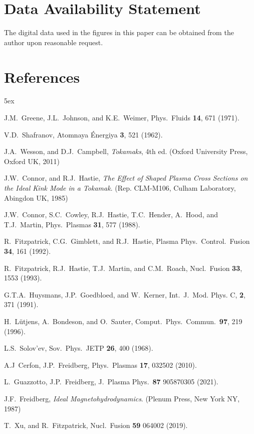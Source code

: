\documentclass[12pt,prb,aps]{revtex4-1}
\begin{document}
\section*{Data Availability Statement}
The digital data used in the figures in this paper can be obtained from the author upon reasonable request.

\section*{References}
\begin{thebibliography}{99}\baselineskip 5ex

 J.M.~Greene, J.L.~Johnson, and K.E.~Weimer,  Phys.\  Fluids  {\bf 14}, 671 (1971).

 V.D.~Shafranov, Atomnaya \'{E}nergiya {\bf 3}, 521  (1962).

 J.A.~Wesson, and D.J.~Campbell, {\em Tokamaks}, 4th ed. (Oxford University Press, Oxford UK, 2011)

 J.W.~Connor, and R.J.~Hastie, {\em The Effect of Shaped Plasma Cross Sections on the Ideal Kink Mode in a Tokamak}. (Rep. CLM-M106, Culham Laboratory, Abingdon UK, 1985)

  J.W.~Connor, S.C.~Cowley, R.J.~Hastie, T.C.~Hender, A.~Hood, and T.J.~Martin, Phys.\ Plasmas {\bf 31}, 577 (1988).

 R.~Fitzpatrick, C.G.~Gimblett, and R.J.~Hastie, Plasma Phys.\ Control.\ Fusion {\bf 34}, 161 (1992). 

 R.~Fitzpatrick, R.J.~Hastie, T.J.~Martin, and C.M.~Roach,  Nucl.\ Fusion {\bf 33}, 1553 (1993).

 G.T.A.~Huysmans, J.P.~Goedbloed, and W.~Kerner, Int.\ J.\ Mod. Phys. C,  {\bf 2}, 371 (1991).

 H.~L\"{u}tjens, A.~Bondeson, and O.~Sauter, Comput.\ Phys.\ Commun.\ {\bf 97}, 219 (1996).

 L.S.~Solov'ev, Sov.\ Phys.\ JETP {\bf 26}, 400 (1968).

 A.J~Cerfon, J.P.~Freidberg, Phys.\  Plasmas  {\bf 17},  032502 (2010).

 L.~Guazzotto, J.P.~Freidberg, J.\  Plasma Phys.\ {\bf 87}  905870305 (2021).

 J.F.~Freidberg, {\em Ideal Magnetohydrodynamics}. (Plenum Press, New York NY, 1987)

 T.~Xu, and R.~Fitzpatrick, Nucl.\ Fusion {\bf 59}  064002 (2019).


\end{thebibliography}
\end{document}
